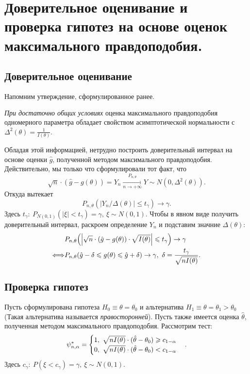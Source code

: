 \section{Доверительное оценивание и проверка гипотез на основе оценок
максимального правдоподобия.}

\subsection{Доверительное оценивание}

Напомним утверждение, сформулированное ранее.

\begin{theorem}
    
    \textit{При достаточно общих условиях} оценка максимального правдоподобия
    одномерного параметра обладает свойством асимптотической нормальности с 
    $\Delta^2(\theta) = \frac{1}{I(\theta)}$.
\end{theorem}

Обладая этой информацией, нетрудно построить доверительный интервал
на основе оценки $\hat{g}$, полученной методом максимального правдоподобия. 
Действительно, мы только что сформулировали тот факт, что
\[
    \sqrt{n} \cdot (\hat{g} - g(\theta)) = Y_n 
    \xrightarrow[n \to +\infty]{P_{n, \theta}} Y \sim N(0, \Delta^2(\theta))
.\]
Откуда вытекает
\[
    P_{n, \theta}(|Y_n / \Delta(\theta)| \leqslant t_\gamma) 
    \to \gamma 
.\]
Здесь $t_\gamma \colon~ P_{N(0, 1)}(|\xi| < t_\gamma) = \gamma,~ \xi 
\sim N(0, 1)$. Чтобы в явном виде получить доверительный интервал, раскроем 
определение $Y_n$ и подставим значние $\Delta(\theta)$:
\begin{align*}
          &P_{n, \theta}\parens*{\abs*{\sqrt{n} \cdot (\hat{g} - g(\theta)) \cdot 
          \sqrt{I(\theta)}} \leqslant t_\gamma} \to \gamma \\
    \Llra &P_{n, \theta}(\hat{g} - \delta \leqslant g(\theta) \leqslant
    \hat{g} + \delta) \to \gamma,~ \delta = \frac{t_\gamma}{\sqrt{n I(\theta)}}
.\end{align*}

\subsection{Проверка гипотез}
Пусть сформулирована гипотеза $H_0 \equiv \theta = \theta_0$ и 
альтернатива $H_1 \equiv \theta = \theta_1 > \theta_0$ (Такая
альтернатива называется \textit{правосторонней}). Пусть также
имеется оценка $\hat{\theta}$, полученная методом максимального правдоподобия.
Рассмотрим тест:
\[
    \psi^*_{n, \alpha} = \begin{cases}
        1,~ \sqrt{n I(\theta)} \cdot (\hat{\theta} - \theta_0) \geqslant 
        c_{1 - \alpha} \\
        0,~ \sqrt{n I(\theta)} \cdot (\hat{\theta} - \theta_0) < c_{1 - \alpha}
    \end{cases}
.\]
Здесь $c_\gamma \colon~ P(\xi < c_\gamma) = \gamma,~ \xi \sim N(0, 1)$.

